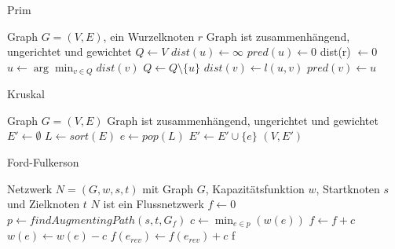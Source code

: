 \documentclass[12pt]{scrartcl}
\begin{document}
\begin{algorithm}
    \caption{Prim}
    \begin{algorithmic}
        \Require Graph $G = (V, E)$, ein Wurzelknoten $r$
        \Ensure Graph ist zusammenhängend, ungerichtet und gewichtet
        \State $Q \gets V$
        \State $dist(u) \gets \infty$ 
        \State $pred(u) \gets 0$ 
        \EndFor
        \State dist(r) $\gets 0$
        \State $u \gets \arg\min_{v \in Q} dist(v)$ 
        \State $Q \gets Q \setminus \{u\}$
         
        \State $dist(v) \gets l(u, v)$
        \State $pred(v) \gets u$
        \EndIf
        \EndFor
        \EndWhile
    \end{algorithmic}
\end{algorithm}

\begin{algorithm}
    \caption{Kruskal}
    \begin{algorithmic}
        \Require Graph $G = (V, E)$
        \Ensure Graph ist zusammenhängend, ungerichtet und gewichtet
        \State $E' \gets \emptyset$ 
        \State $L \gets sort(E)$ 
        \State $e \gets pop(L)$ 
        \State $E' \gets E' \cup \{e\}$ 
        \EndIf
        \EndWhile
        \State \Return $(V, E')$ 
    \end{algorithmic}
\end{algorithm}

\pagebreak

\begin{algorithm}
    \caption{Ford-Fulkerson}
    \begin{algorithmic}
        \Require Netzwerk $N = (G, w, s, t)$ mit Graph $G$, Kapazitätsfunktion $w$, Startknoten $s$ und Zielknoten $t$
        \Ensure $N$ ist ein Flussnetzwerk
        \State $f \gets 0$ 
        \State $p \gets findAugmentingPath(s, t, G_f)$ 
        \State $c \gets \min_{e \in p} (w(e))$ 
        \State $f \gets f + c$
        \State $w(e) \gets w(e) - c$
        \State $f(e_{rev}) \gets f(e_{rev}) + c$ 
        \EndFor
        \EndWhile
        \State \Return f 
    \end{algorithmic}
\end{algorithm}
\end{document}
